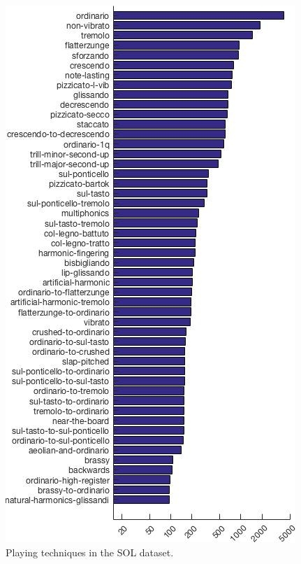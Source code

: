 \begin{figure}[h!]
\centering
\includegraphics[width=\linewidth]{./figs/histogram/histogram_modes.png}
\caption{Playing techniques in the SOL dataset.}
\label{fig:technique-histogram}
\end{figure}



